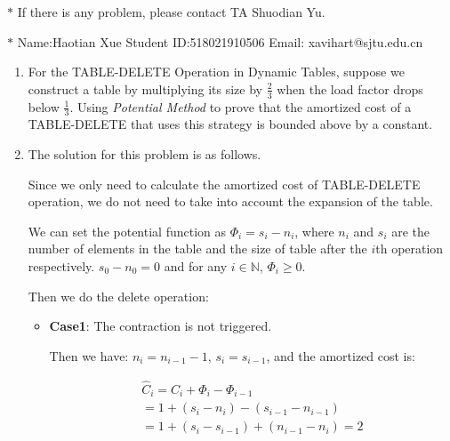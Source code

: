 \documentclass[12pt,a4paper]{article}
\makeatletter
\newtheorem*{solution}{Solution}
\theoremstyle{definition}
\renewenvironment{solution}[1][Solution] {\par\pushQED{\qed}\normalfont\topsep6\p@\@plus6\p@\relax\trivlist\item[\hskip\labelsep\bfseries#1\@addpunct{.}]\ignorespaces}{\popQED\endtrivlist\@endpefalse} \makeatother
\makeatother
\begin{document}
\noindent
{}
\noindent{}
\begin{center}
\footnotesize{\color{red}$*$ If there is any problem, please contact TA Shuodian Yu. }

\footnotesize{\color{blue}$*$ Name:Haotian Xue  \quad Student ID:518021910506 \quad Email: xavihart@sjtu.edu.cn}
\end{center}
\begin{enumerate}
	\item For the TABLE-DELETE Operation in Dynamic Tables, suppose we construct a table by multiplying its size by $\frac 23$ when the load factor drops below $\frac 13$. Using \emph{Potential Method} to prove that the amortized cost of a TABLE-DELETE that uses this strategy is bounded above by a constant.
	
	\begin{solution}
		The solution for this problem is as follows.

		Since we only need to calculate the amortized cost of TABLE-DELETE operation,  we do not need to take into
		account the expansion of the table.
		
		We can set the potential function as $\Phi_i = s_i - n_i$, where $n_i$ and $s_i$ are the number of elements in the table and the size of table after the $i$th operation respectively.
	$s_0 - n_0 = 0$ and for any $i \in \mathbb{N}$, $\Phi_i \geq 0$.
		
		Then we do the delete operation:
		
		\begin{itemize}
			\item \textbf{Case1}: The contraction is not triggered.
	
			Then we have: $n_i = n_{i-1} - 1$, $s_i = s_{i-1}$, and the amortized cost is:

			\begin{gather*}
				\hat{C}_i = C_i + \Phi_{i} - \Phi_{i-1} \\
				 = 1 + (s_i - n_i) - (s_{i - 1} - n_{i - 1})\\
				 = 1 + (s_i - s_{i - 1}) + (n_{i - 1} - n_{i}) =2
			\end{gather*}


\end{itemize}
\end{solution}
\end{enumerate}
\end{document}
